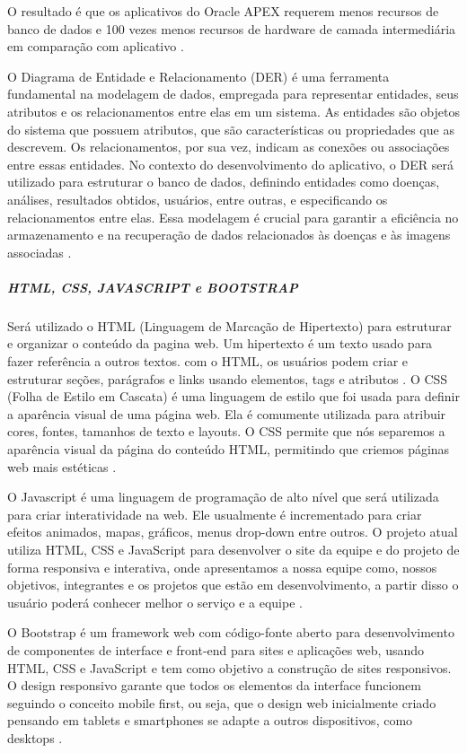 O resultado é que os aplicativos do Oracle APEX requerem menos recursos de banco de dados e 100 vezes menos recursos de hardware de camada intermediária em comparação com aplicativo \cite{oracle2024}.

O Diagrama de Entidade e Relacionamento (DER) é uma ferramenta fundamental na modelagem de dados, empregada para representar entidades, seus atributos e os relacionamentos entre elas em um sistema. As entidades são objetos do sistema que possuem atributos, que são características ou propriedades que as descrevem. Os relacionamentos, por sua vez, indicam as conexões ou associações entre essas entidades. No contexto do desenvolvimento do aplicativo, o DER será utilizado para estruturar o banco de dados, definindo entidades como doenças, análises, resultados obtidos, usuários, entre outras, e especificando os relacionamentos entre elas. Essa modelagem é crucial para garantir a eficiência no armazenamento e na recuperação de dados relacionados às doenças e às imagens associadas \cite{awari2023}.

\subparagraph*{\textbf{HTML, CSS, JAVASCRIPT e BOOTSTRAP}}

Será utilizado o HTML (Linguagem de Marcação de Hipertexto) para estruturar e organizar o conteúdo da pagina web. Um hipertexto é um texto usado para fazer referência a outros textos. com o HTML, os usuários podem criar e estruturar seções, parágrafos e links usando elementos, tags e atributos \cite{longen2023}.  
O CSS (Folha de Estilo em Cascata) é uma linguagem de estilo que foi usada para definir a aparência visual de uma página web. Ela é comumente utilizada para atribuir cores, fontes, tamanhos de texto e layouts. O CSS permite que nós separemos a aparência visual da página do conteúdo HTML, permitindo que criemos páginas web mais estéticas \cite{ariane2022}. 

O Javascript é uma linguagem de programação de alto nível que será utilizada para criar interatividade na web. Ele usualmente é incrementado para criar efeitos animados, mapas, gráficos, menus drop-down entre outros. O projeto atual utiliza HTML, CSS e JavaScript para desenvolver o site da equipe e do projeto de forma responsiva e interativa, onde apresentamos a nossa equipe como, nossos objetivos, integrantes e os projetos que estão em desenvolvimento, a partir disso o usuário poderá conhecer melhor o serviço e a equipe \cite{carlos2023}. 

O Bootstrap é um framework web com código-fonte aberto para desenvolvimento de componentes de interface e front-end para sites e aplicações web, usando HTML, CSS e JavaScript e tem como objetivo a construção de sites responsivos. O design responsivo garante que todos os elementos da interface funcionem seguindo o conceito mobile first, ou seja, que o design web inicialmente criado pensando em tablets e smartphones se adapte a outros dispositivos, como desktops \cite{ebac2023}. 

